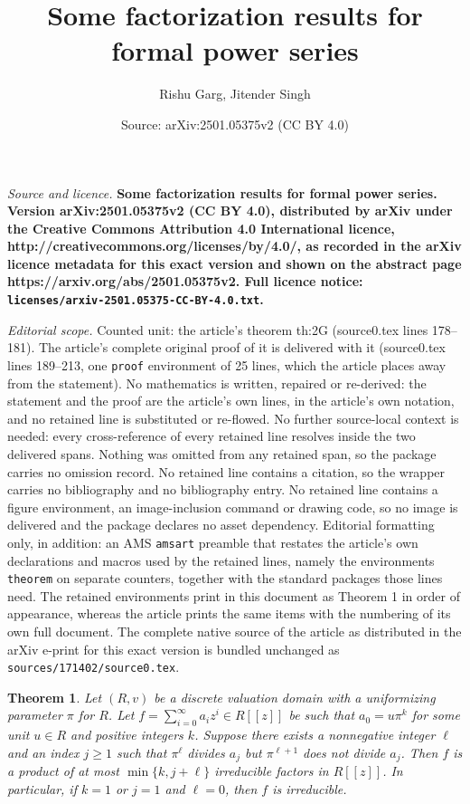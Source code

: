 \documentclass[10pt,a4paper]{amsart}
\title{\bf Some factorization results for formal power series}
\author{Rishu Garg, Jitender Singh}
\date{Source: arXiv:2501.05375v2 (CC BY 4.0)}
\newtheorem{theorem}{Theorem}
\begin{document}
\maketitle

\noindent\emph{Source and licence.} \bf Some factorization results for formal power series. Version arXiv:2501.05375v2 (CC BY 4.0), distributed by arXiv under the Creative Commons Attribution 4.0 International licence, http://creativecommons.org/licenses/by/4.0/, as recorded in the arXiv licence metadata for this exact version and shown on the abstract page https://arxiv.org/abs/2501.05375v2. Full licence notice: \texttt{licenses/arxiv-2501.05375-CC-BY-4.0.txt}.\par\smallskip

\noindent\textit{Editorial scope.} Counted unit: the article's theorem th:2G (source0.tex lines 178--181). The article's complete original proof of it is delivered with it (source0.tex lines 189--213, one \texttt{proof} environment of 25 lines, which the article places away from the statement). No mathematics is written, repaired or re-derived: the statement and the proof are the article's own lines, in the article's own notation, and no retained line is substituted or re-flowed.  No further source-local context is needed: every cross-reference of every retained line resolves inside the two delivered spans.  Nothing was omitted from any retained span, so the package carries no omission record.  No retained line contains a citation, so the wrapper carries no bibliography and no bibliography entry.  No retained line contains a figure environment, an image-inclusion command or drawing code, so no image is delivered and the package declares no asset dependency.  Editorial formatting only, in addition: an AMS \texttt{amsart} preamble that restates the article's own declarations and macros used by the retained lines, namely the environments \texttt{theorem} on separate counters, together with the standard packages those lines need.  The retained environments print in this document as Theorem 1 in order of appearance, whereas the article prints the same items with the numbering of its own full document.  The complete native source of the article as distributed in the arXiv e-print for this exact version is bundled unchanged as \texttt{sources/171402/source0.tex}.
\begin{theorem}\label{th:2G}
  Let $(R,v)$ be a discrete valuation domain with a uniformizing parameter $\pi$  for $R$. Let
  $f = \sum_{i=0}^\infty a_i z^i\in R[[z]]$ be such that $a_0= u \pi^k$ for some  unit $u\in R$ and positive integers $k$. Suppose there exists a nonnegative integer $\ell$  and an index $j\geq 1$ such that $\pi^{\ell}$ divides $a_{j}$ but  $\pi^{\ell+1}$ does not divide $a_{j}$. Then $f$ is a product of at most $\min\{k,j+\ell\}$ irreducible factors in $R[[z]]$. In particular, if $k=1$ or $j=1$ and $\ell=0$, then $f$ is irreducible.
\end{theorem}
\end{document}
